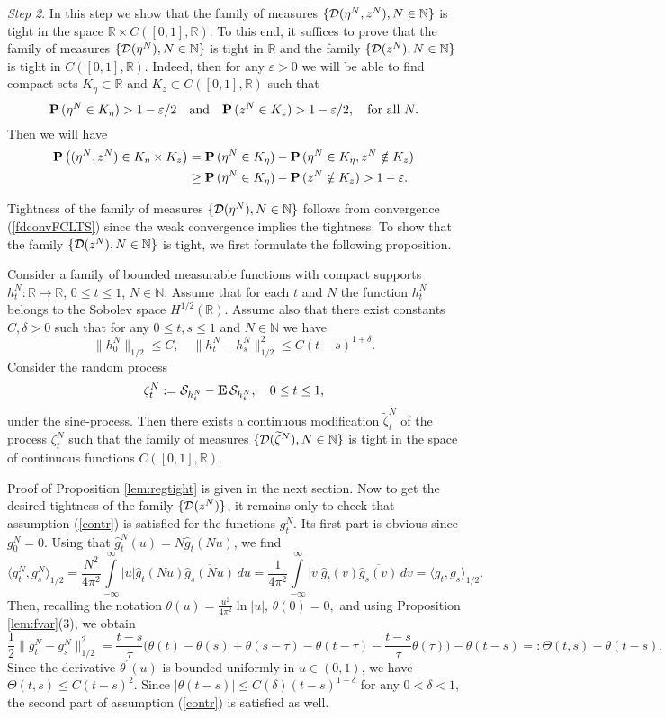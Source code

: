 \documentclass{article}
\numberwithin{equation}{section}
\newcommand{\mR}{\mathbb{R}}
\newcommand{\mN}{\mathbb{N}}
\newcommand{\DD}{{\cal D}}
\newcommand{\SSS}{{\cal S}}
\newcommand{\eps}{\varepsilon}
\newcommand{\tht}{\theta}
\newcommand{\de}{\delta}
\newcommand{\ov}{\overline}
\newcommand{\wid}{\widetilde}
\newcommand{\MO}{\mbox{\bf E}\,}
\newcommand{\PR}{\mbox{\bf P}\,}
\newcommand{\ds}{\displaystyle{}}
\newcommand{\ran}{\rangle}
\newcommand{\lan}{\langle}
\newcommand{\fr}{\frac}
\newcommand{\qmb}{\quad\mbox}
\newcommand{\qu}{\quad}
\newcommand{\ili}{\int\limits}
\newcommand{\lbl}{\label}
\newcommand{\rprop}{Proposition \nolinebreak}
\newcommand{\bee}{\begin{equation}}
\newcommand{\eee}{\end{equation}}
\newcommand{\bpp}{\begin{prop}}
\newcommand{\epp}{\end{prop}}
\newcommand{\non}{\nonumber}
\begin{document}
{\it Step 2}. In this step we show that
the family of measures $\{\DD(\eta^N,z^N), N\in\mN\}$
is tight in the space $\mR\times C([0,1],\mR)$.
To this end, it suffices to prove that
the family of measures $\{\DD(\eta^N), N\in\mN\}$
is tight in $\mR$
and the family $\{\DD(z^N), N\in\mN\}$
is tight in $C([0,1],\mR)$.
Indeed, then for any $\eps>0$ we will be able to find
compact sets $K_\eta\subset\mR$ and $K_z\subset C([0,1],\mR)$
such that
$$
\PR(\eta^N\in K_\eta)>1-\eps/2 \qmb{and}\qu \PR(z^N\in K_z)>1-\eps/2, \qmb{for all }N.
$$
Then we will have
\begin{align}\non
\PR\big((\eta^N,z^N)\in K_\eta\times K_z\big)
&= \PR(\eta^N\in K_\eta) - \PR(\eta^N\in K_\eta, z^N\notin K_z) \\ \non
&\geq \PR(\eta^N\in K_\eta) - \PR(z^N\notin K_z) > 1-\eps.
\end{align}

Tightness of the family of measures $\{\DD(\eta^N), N\in\mN\}$
follows from convergence (\ref{fdconvFCLTS})
since the weak convergence implies the tightness.
To show that the family $\{\DD(z^N), N\in\mN\}$ is tight,
we first formulate the following proposition.
\bpp\lbl{lem:regtight}
Consider a family of bounded measurable functions with compact supports
$h^N_t:\mR\mapsto\mR$,  $0\leq t \leq 1$, $N\in\mN$.
Assume that for each $t$ and $N$
the function $h^N_t$ belongs to the Sobolev space $H^{1/2}(\mR)$.
Assume also that there exist constants $C,\de>0$
such that for any $0\leq t,s \leq 1$ and $N\in\mN$ we have
\bee\lbl{contr}
\|h^N_0\|_{1/2}\leq C,
\qu
\|h^N_t-h^N_s\|^2_{1/2}\leq C(t-s)^{1+\de}.
\eee
Consider the random process
$$
\zeta^N_t:=\SSS_{h_t^N} -\MO\SSS_{h_t^N}, \qu 0\leq t\leq 1,
$$
under the sine-process.
Then there exists a continuous modification $\wid\zeta^N_t$
of the process $\zeta_t^N$
such that the family of measures
$\{\DD(\wid\zeta^N),N\in\mN\}$ is tight
in the space of continuous functions $C([0,1],\mR)$.
\epp
Proof of \rprop \ref{lem:regtight}
is given in the next section.
Now to get the desired tightness of the family $\{\DD(z^N)\}$,
it remains only to check that
assumption (\ref{contr}) is satisfied for the functions $g^N_t$.
Its first part is obvious since $g^N_0=0.$
Using that $\hat g_t^N(u)=N\hat g_t(Nu)$, we find
\bee\lbl{gg12}
\lan g^N_t,g^N_s\ran_{1/2}
=\fr{N^2}{4\pi^2}\ili_{-\infty}^\infty |u|\hat g_t(Nu)\ov{\hat g_s(Nu)} \,du
=\fr{1}{4\pi^2}\ili_{-\infty}^\infty |v|\hat g_t(v)\ov{\hat g_s(v)} \,dv
=\lan g_t,g_s\ran_{1/2}.
\eee
Then, recalling the notation
${\ds \theta(u)=\fr{u^2}{4\pi^2} \ln |u|, \, \theta(0)=0,}$
and using \rprop \ref{lem:fvar}(3), we obtain
$$
\fr12\|g^N_t-g^N_s\|_{1/2}^2
		=\fr{t-s}{\tau}
		 \Big(\theta(t)-\theta(s)
			+\theta(s-\tau)-\theta(t-\tau) - \fr{t-s}{\tau}\tht(\tau)\Big)
			-\tht(t-s)
=:\Theta(t,s) -\tht(t-s).
$$
Since the derivative $\theta^\prime(u)$ is bounded uniformly in $u\in (0,1)$,
we have
$\Theta(t,s) \leq C(t-s)^2$.
Since $|\tht(t-s)|\leq C(\delta)(t-s)^{1+\delta}$
for any $0<\delta<1$, the second part of assumption (\ref{contr}) is satisfied as well.
\end{document}
